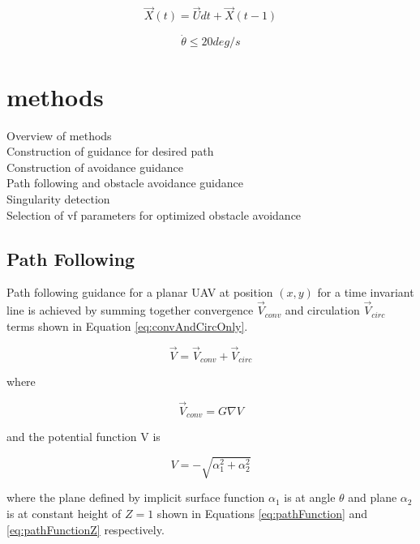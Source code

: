 \documentclass[conf]{new-aiaa}
\begin{document}
\begin{equation}
\label{uavPosition}
\overrightarrow{X}(t) = \overrightarrow{U}dt + \overrightarrow{X}(t-1)
\end{equation}


\begin{equation}
\label{turnRate}
\dot{\theta} \leq 20 deg/s
\end{equation}




\section{methods}
Overview of methods \\
Construction of guidance for desired path \\
Construction of avoidance guidance \\
Path following and obstacle avoidance guidance \\
Singularity detection \\
Selection of vf parameters for optimized obstacle avoidance \\

\subsection{Path Following}
Path following guidance for a planar UAV at position $(x,y)$ for a time invariant line is achieved by summing together convergence $\overrightarrow{V}_{conv}$ and circulation $\overrightarrow{V}_{circ}$ terms shown in Equation \ref{eq:convAndCircOnly}.

\begin{equation}
\label{eq:convAndCircOnly}
\overrightarrow{V} = \overrightarrow{V}_{conv} + \overrightarrow{V}_{circ} 
\end{equation}

where

\begin{equation}
\label{eq:timeInvariantPath}
 \overrightarrow{V}_{conv} = G \nabla V
\end{equation}

and the potential function V is

\begin{equation}
\label{potentialFunction}
V = -\sqrt{\alpha_1^2+\alpha_2^2}
\end{equation}


where the plane defined by implicit surface function $\alpha_1$ is at angle $\theta$ and plane $\alpha_2$ is at constant height of $Z = 1$ shown in Equations \ref{eq:pathFunction} and \ref{eq:pathFunctionZ} respectively.
\end{document}
